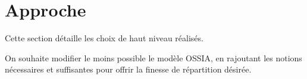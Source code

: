 \documentclass[10pt]{article}
\newcommand\ossia{OSSIA\xspace}
\begin{document}













\section{Approche}
Cette section détaille les choix de haut niveau réalisés.

On souhaite modifier le moins possible le modèle \ossia, 
en rajoutant les notions nécessaires et suffisantes pour offrir la finesse de répartition désirée.
\end{document}
